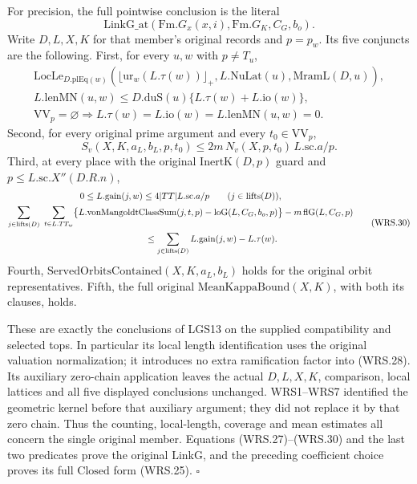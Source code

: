 For precision, the full pointwise conclusion is the literal
\[
 \mathrm{LinkG\_at}(\mathrm{Fm}.G_x(x,i),\mathrm{Fm}.G_K,C_G,b_o).
\]
Write \(D,L,X,K\) for that member's original records and
\(p=p_w\).  Its five conjuncts are the following.
First, for every \(u,w\) with \(p\ne T_u\),
\[
 \begin{gathered}
 \mathrm{LocLe}_{D.\mathrm{plEq}(w)}
    (\lfloor\mathrm{ur}_w(L.\tau(w))\rfloor_+,
          L.\mathrm{NuLat}(u),\mathrm{MramL}(D,u)),\\
 L.\mathrm{lenMN}(u,w)
       \le D.\mathrm{duS}(u)\{L.\tau(w)+L.\mathrm{io}(w)\},\\
 \mathrm{VV}_{p}=\varnothing\Longrightarrow
       L.\tau(w)=L.\mathrm{io}(w)=L.\mathrm{lenMN}(u,w)=0.
 \end{gathered}                                                   \tag{WRS.28}
\]
Second, for every original prime argument and every
\(t_0\in\mathrm{VV}_{p}\),
\[
 S_v(X,K,a_L,b_L,p,t_0)
      \le 2m\,N_v(X,p,t_0)\,L.\mathrm{sc}.a/p.
 \tag{WRS.29}
\]
Third, at every place with the original \(\mathrm{InertK}(D,p)\)
guard and \(p\le L.\mathrm{sc}.X''(D.R.n)\),
\[
 \begin{gathered}
 0\le L.\mathrm{gain}(j,w)
       \le4|TT|L.\mathrm{sc}.a/p
       \qquad(j\in\mathrm{lifts}(D)),\\
 \sum_{j\in\mathrm{lifts}(D)}\ \sum_{t\in L.TT_w}
   \bigl\{L.\mathrm{vonMangoldtClassSum}(j,t,p)
                  -\mathrm{loG}(L,C_G,b_o,p)\bigr\}
       -m\,\mathrm{flG}(L,C_G,p)\\
 \hspace{25mm}\le
       \sum_{j\in\mathrm{lifts}(D)}L.\mathrm{gain}(j,w)-L.\tau(w).
 \end{gathered}                                                   \tag{WRS.30}
\]
Fourth, \(\mathrm{ServedOrbitsContained}(X,K,a_L,b_L)\) holds
for the original orbit representatives.  Fifth, the full original
\(\mathrm{MeanKappaBound}(X,K)\), with both its clauses, holds.

These are exactly the conclusions of LGS13 on the supplied
compatibility and selected tops.  In particular its local length
identification uses the original valuation normalization; it
introduces no extra ramification factor into (WRS.28).  Its
auxiliary zero-chain application leaves the actual \(D,L,X,K\),
comparison, local lattices and all five displayed conclusions
unchanged.  WRS1--WRS7 identified the geometric kernel before
that auxiliary argument; they did not replace it by that zero chain.
Thus the counting, local-length, coverage and mean estimates all
concern the single original member.  Equations (WRS.27)--(WRS.30)
and the last two predicates prove the original \(\mathrm{LinkG}\),
and the preceding coefficient choice proves its full \(\mathrm{Closed}\)
form (WRS.25).
\hfill\(\square\)

